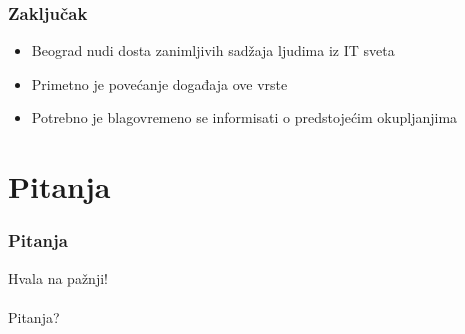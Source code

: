 \documentclass[hyperref={bookmarks=false},aspectratio=169]{beamer}
\begin{document}
\begin{frame}
\frametitle{Zaključak}

\begin{itemize}
    \item Beograd nudi dosta zanimljivih sadžaja ljudima iz IT sveta
    \item Primetno je povećanje događaja ove vrste
    \item Potrebno je blagovremeno se informisati o predstojećim okupljanjima
\end{itemize}

\end{frame}

\section{Pitanja}

\begin{frame}
\frametitle{Pitanja}

\begin{center}
\Huge{Hvala na pažnji!}
\\ \\
\LARGE{Pitanja?}
\end{center}

\end{frame}
\end{document}
